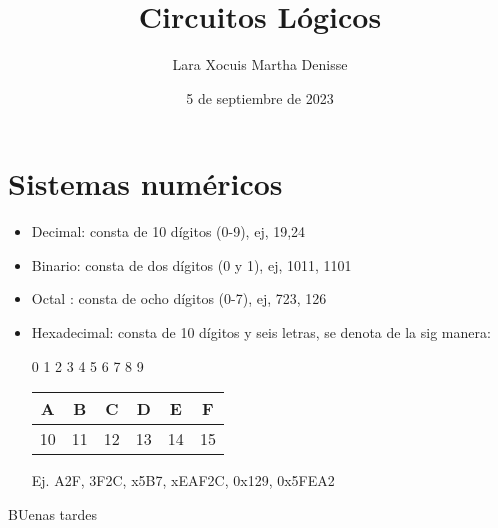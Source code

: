 \documentclass[letterpaper,12pt]{article}
\title {\textbf{Circuitos Lógicos}}
\author{Lara Xocuis Martha Denisse}
\date{5 de septiembre de 2023}
\begin{document}
\begin{sloppypar}
\section{Sistemas numéricos}
\begin{itemize}
    \item Decimal: consta de 10 dígitos (0-9), ej, 19,24 
    \item Binario: consta de dos dígitos (0 y 1), ej, 1011, 1101
    \item Octal : consta de ocho dígitos (0-7), ej, 723, 126
    \item Hexadecimal: consta de 10 dígitos y seis letras, se denota de la sig manera:
    
    0 1 2 3 4 5 6 7 8 9

    \begin{table}[H]
        \centering
        \begin{tabular}{|c|c|c|c|c|c|}
            \hline 
            A & B & C & D & E & F \\ 
            \hline
            10 & 11 & 12 & 13 & 14 & 15 \\ 
            \hline
        \end{tabular}
    \end{table}

    Ej. A2F, 3F2C, x5B7, xEAF2C, 0x129, 0x5FEA2
\end{itemize}

BUenas tardes

\end{sloppypar}
\end{document}
